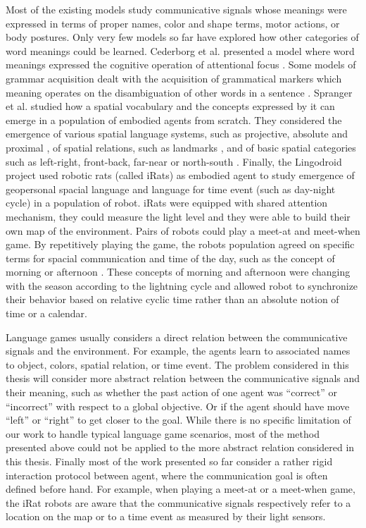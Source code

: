 Most of the existing models study communicative signals whose meanings were expressed in terms of proper names, color and shape terms, motor actions, or body postures. Only very few models so far have explored how other categories of word meanings could be learned. Cederborg et al. presented a model where word meanings expressed the cognitive operation of attentional focus \cite{cederborg2011imitating}. Some models of grammar acquisition dealt with the acquisition of grammatical markers which meaning operates on the disambiguation of other words in a sentence \cite{steels2012fluid}. Spranger et al. studied how a spatial vocabulary and the concepts expressed by it can emerge in a population of embodied agents from scratch. They considered the emergence of various spatial language systems, such as projective, absolute and proximal \cite{spranger2012emergent,spranger2013grounded}, of spatial relations, such as landmarks \cite{spranger2013evolutionary}, and of basic spatial categories such as left-right, front-back, far-near or north-south \cite{spranger2012co}. Finally, the Lingodroid project \cite{schulz2010robots} used robotic rats (called iRats) as embodied agent to study emergence of geopersonal spacial language and language for time event (such as day-night cycle) in a population of robot. iRats were equipped with shared attention mechanism, they could measure the light level and they were able to build their own map of the environment. Pairs of robots could play a meet-at and meet-when game. By repetitively playing the game, the robots population agreed on specific terms for spacial communication and time of the day, such as the concept of morning or afternoon \cite{schulz2011lingodroids,heath2012long}. These concepts of morning and afternoon were changing with the season according to the lightning cycle and allowed robot to synchronize their behavior based on relative cyclic time rather than an absolute notion of time or a calendar.

Language games usually considers a direct relation between the communicative signals and the environment. For example, the agents learn to associated names to object, colors, spatial relation, or time event. The problem considered in this thesis will consider more abstract relation between the communicative signals and their meaning, such as whether the past action of one agent was ``correct'' or ``incorrect'' with respect to a global objective. Or if the agent should have move ``left'' or ``right'' to get closer to the goal. While there is no specific limitation of our work to handle typical language game scenarios, most of the method presented above could not be applied to the more abstract relation considered in this thesis. Finally most of the work presented so far consider a rather rigid interaction protocol between agent, where the communication goal is often defined before hand. For example, when playing a meet-at or a meet-when game, the iRat robots are aware that the communicative signals respectively refer to a location on the map or to a time event as measured by their light sensors.

